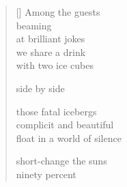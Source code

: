 \documentclass[11pt,a4paper]{article}
\begin{document}
\thispagestyle{empty}


\settowidth{\versewidth}{float in a world of silence}

\bigskip

\begin{verse}[\versewidth]
  Among the guests \\
  beaming\\
  at brilliant jokes\\
  we share a drink\\
  with two ice cubes

  side by side

  those fatal icebergs\\
  complicit and beautiful\\
  float in a world of silence

  short-change the suns\\
  ninety percent
\end{verse}
\end{document}
